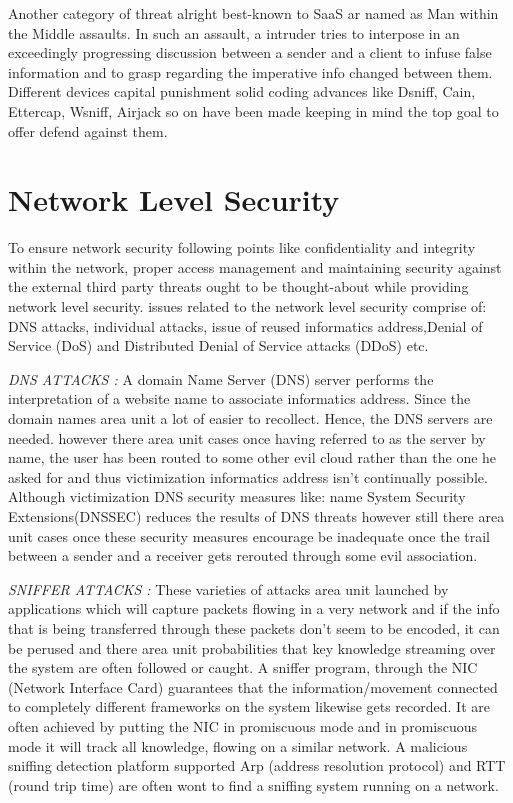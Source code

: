 Another category of threat alright best-known to SaaS ar named as Man within the
Middle assaults. In such an assault, a intruder tries to interpose in an exceedingly progressing discussion between a sender and a client to infuse false information and to grasp regarding the imperative info changed between them. Different devices capital punishment solid coding advances like Dsniff, Cain, Ettercap, Wsniff, Airjack so on have been made keeping in mind the top goal to offer defend against them.
\section{Network Level Security}
 To ensure network security following points like confidentiality and integrity within the network, proper access management and maintaining security against the external third party threats ought to be thought-about while providing network level security. issues related to the network level security comprise of: DNS attacks, individual attacks, issue of reused informatics address,Denial of Service (DoS) and Distributed Denial of Service attacks (DDoS) etc.

\textit{DNS ATTACKS :}
A domain Name Server (DNS) server performs the interpretation of a website name
to associate informatics address. Since the domain names area unit a lot of easier to recollect. Hence, the DNS servers are needed. however there area unit cases once having referred to as the server by name, the user has been routed to
some other evil cloud rather than the one he asked for and thus victimization
informatics address isn't continually possible.
Although victimization DNS security measures like: name System Security
Extensions(DNSSEC) reduces the results of DNS threats however still there area unit cases once these security measures encourage be inadequate once the trail between a sender and a receiver gets rerouted through some evil association.

\textit{SNIFFER ATTACKS :}
These varieties of attacks area unit launched by applications which will capture packets flowing in a very network and if the info that is being transferred through these packets don't seem to be encoded, it can be perused and there area unit probabilities that key knowledge streaming over the system are often followed or caught. A sniffer program, through the NIC (Network Interface Card) guarantees that the information/movement connected to completely different frameworks on the system likewise gets recorded. It are often achieved by putting the NIC in promiscuous mode and in promiscuous mode it will track all knowledge, flowing on a similar
network. A malicious sniffing detection platform supported Arp (address resolution
protocol) and RTT (round trip time) are often wont to find a sniffing system running on a network.

